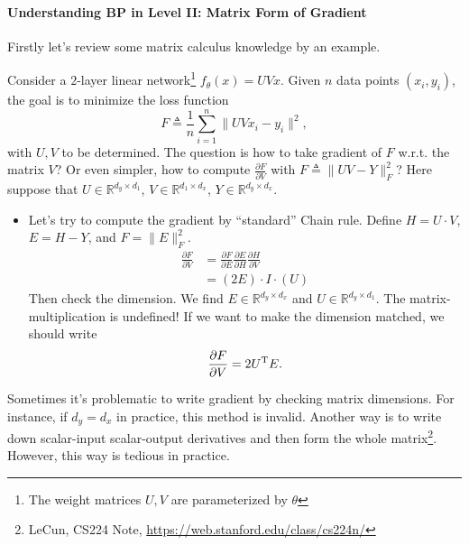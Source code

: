 \paragraph{Understanding BP in Level II: Matrix Form of Gradient}
Firstly let's review some matrix calculus knowledge by an example.
\begin{example}
Consider a $2$-layer linear network\footnote{The weight matrices $U,V$ are parameterized by $\theta$} $f_{\theta}(x) = UVx.$ Given $n$ data points $(x_i,y_i)$, the goal is to minimize the loss function 
\[
F\triangleq\frac{1}{n}\sum_{i=1}^n\|UVx_i - y_i\|^2,
\]
with $U,V$ to be determined. The question is how to take gradient of $F$ w.r.t. the matrix $V$?
Or even simpler, how to compute $\frac{\partial F}{\partial V}$ with $F\triangleq\|UV-Y\|_F^2$? Here suppose that $U\in\mathbb{R}^{d_y\times d_1}$, $V\in\mathbb{R}^{d_1\times d_x}$, $Y\in\mathbb{R}^{d_y\times d_x}$.
\begin{itemize}
\item
Let's try to compute the gradient by ``standard'' Chain rule. Define $H=U\cdot V$, $E=H-Y$, and $F=\|E\|_F^2$.
\begin{align*}
\frac{\partial F}{\partial V}&=\frac{\partial F}{\partial E}\frac{\partial E}{\partial H}\frac{\partial H}{\partial V}\\
&=(2E)\cdot I\cdot(U)
\end{align*}
Then check the dimension. We find $E\in \mathbb{R}^{d_y\times d_x}$ and $U\in \mathbb{R}^{d_y\times d_1}$. The matrix-multiplication is undefined!
If we want to make the dimension matched, we should write
\[
\frac{\partial F}{\partial V} = 2U^{\mathrm T} E.
\]
\end{itemize}
Sometimes it's problematic to write gradient by checking matrix dimensions. For instance, if $d_y=d_x$ in practice, this method is invalid.
Another way is to write down scalar-input scalar-output derivatives and then form the whole matrix\footnote{LeCun, CS224 Note, \url{https://web.stanford.edu/class/cs224n/}}. However, this way is tedious in practice. 


\end{example}
